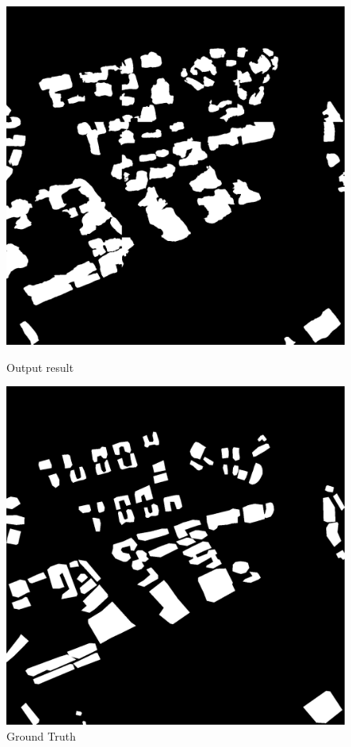 \documentclass[]{IEEEtran}
\begin{document}


\newpage


\begin{figure}
	\vspace{0.5cm}
		\centering
		\includegraphics[width=0.7\columnwidth]{fw}
		\caption{Output result}
		\label{fig:fw}
	\vspace{0.3cm}
		\centering
		\includegraphics[width=0.7\columnwidth]{rt}
		\caption{Ground Truth}
		\label{fig:rt}
\end{figure}





\end{document}
